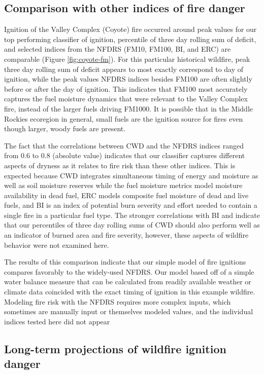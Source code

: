 \documentclass[11p]{article}
\begin{document}
\subsection{Comparison with other indices of fire danger}

Ignition of the Valley Complex (Coyote) fire occurred around peak values for our top performing classifier of ignition, percentile of three day rolling sum of deficit, and selected indices from the NFDRS (FM10, FM100, BI, and ERC) are comparable (Figure \ref{fig:coyote-fm}). For this particular historical wildfire, peak three day rolling sum of deficit appears to most exactly correspond to day of ignition, while the peak values NFDRS indices besides FM100 are often slightly before or after the day of ignition. This indicates that FM100 most accurately captures the fuel moisture dynamics that were relevant to the Valley Complex fire, instead of the larger fuels driving FM1000. It is possible that in the Middle Rockies ecoregion in general, small fuels are the ignition source for fires even though larger, woody fuels are present.

The fact that the correlations between CWD and the NFDRS indices ranged from 0.6 to 0.8 (absolute value) indicates that our classifier captures different aspects of dryness as it relates to fire risk than these other indices. This is expected because CWD integrates simultaneous timing of energy and moisture as well as soil moisture reserves while the fuel moisture metrics model moisture availability in dead fuel, ERC models composite fuel moisture of dead and live fuels, and BI is an index of potential burn severity and effort needed to contain a single fire in a particular fuel type. The stronger correlations with BI and indicate that our percentiles of three day rolling sums of CWD should also perform well as an indicator of burned area and fire severity, however, these aspects of wildfire behavior were not examined here. 

The results of this comparison indicate that our simple model of fire ignitions compares favorably to the widely-used NFDRS. Our model based off of a simple water balance measure that can be calculated from readily available weather or climate data coincided with the exact timing of ignition in this example wildfire. Modeling fire risk with the NFDRS requires more complex inputs, which sometimes are manually input or themselves modeled values, and the individual indices tested here did not appear 

\subsection{Long-term projections of wildfire ignition danger}
\end{document}
